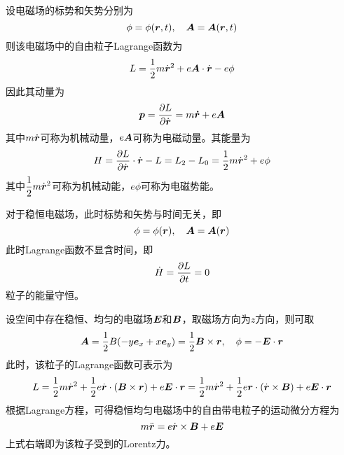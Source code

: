 \begin{example}
设电磁场的标势和矢势分别为
\begin{equation*}
	\phi = \phi(\boldsymbol{r},t),\quad \boldsymbol{A} = \boldsymbol{A}(\boldsymbol{r},t)
\end{equation*}
则该电磁场中的自由粒子Lagrange函数为
\begin{equation}
	L = \frac12 m\dot{\boldsymbol{r}}^2 + e \boldsymbol{A} \cdot \dot{\boldsymbol{r}} - e\phi
\end{equation}
因此其动量为
\begin{equation}
	\boldsymbol{p} = \frac{\partial L}{\partial \dot{\boldsymbol{r}}} = m\boldsymbol{\dot{r}} + e\boldsymbol{A}
\end{equation}
其中$m\dot{\boldsymbol{r}}$可称为{\heiti 机械动量}，$e\boldsymbol{A}$可称为{\heiti 电磁动量}。其能量为
\begin{equation}
	H = \frac{\partial L}{\partial \dot{\boldsymbol{r}}} \cdot \dot{\boldsymbol{r}} - L = L_2 - L_0 = \frac12 m\dot{\boldsymbol{r}}^2 + e\phi
\end{equation}
其中$\dfrac12 m\dot{\boldsymbol{r}}^2$可称为{\heiti 机械动能}，$e\phi$可称为{\heiti 电磁势能}。

对于稳恒电磁场，此时标势和矢势与时间无关，即
\begin{equation*}
	\phi = \phi(\boldsymbol{r}),\quad \boldsymbol{A} = \boldsymbol{A}(\boldsymbol{r})
\end{equation*}
此时Lagrange函数不显含时间，即
\begin{equation*}
	\dot{H} = \frac{\partial L}{\partial t} = 0
\end{equation*}
粒子的能量守恒。
\end{example}

\begin{example}[稳恒均匀电磁场中的自由带电粒子]
设空间中存在稳恒、均匀的电磁场$\boldsymbol{E}$和$\boldsymbol{B}$，取磁场方向为$z$方向，则可取
\begin{equation*}
	\boldsymbol{A} = \frac12 B(-y\boldsymbol{e}_x + x\boldsymbol{e}_y) = \frac12 \boldsymbol{B} \times \boldsymbol{r},\quad \phi = -\boldsymbol{E} \cdot \boldsymbol{r}
\end{equation*}
此时，该粒子的Lagrange函数可表示为
\begin{equation*}
	L = \frac12 m\dot{\boldsymbol{r}}^2 + \frac12 e\dot{\boldsymbol{r}} \cdot (\boldsymbol{B} \times \boldsymbol{r}) + e\boldsymbol{E} \cdot \boldsymbol{r} = \frac12 m\dot{\boldsymbol{r}}^2 + \frac12 e \boldsymbol{r} \cdot (\dot{\boldsymbol{r}} \times \boldsymbol{B}) + e\boldsymbol{E} \cdot \boldsymbol{r} 
\end{equation*}
根据Lagrange方程，可得稳恒均匀电磁场中的自由带电粒子的运动微分方程为
\begin{equation*}
	m \ddot{\boldsymbol{r}} = e\dot{\boldsymbol{r}} \times \boldsymbol{B} + e\boldsymbol{E}
\end{equation*}
上式右端即为该粒子受到的Lorentz力。
\end{example}

